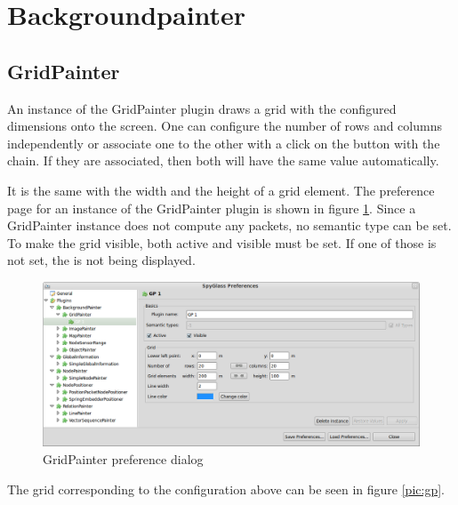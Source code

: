 \newpage
\section{Backgroundpainter}

\subsection{GridPainter}

An instance of the GridPainter plugin draws a grid with the configured dimensions onto the screen.
One can configure the number of rows and columns independently or associate one to the other with a click
on the button with the chain. If they are associated, then both will have the same value automatically.

It is the same with the width and the height of a grid element. The preference page for an instance of the GridPainter
plugin is shown in figure \ref{pic:gp_preferences}. Since a GridPainter instance does not compute any packets, no semantic type
can be set. To make the grid visible, both active and visible must be set. If one of those is not set, the
is not being displayed.

\begin{figure}[htb]
  \begin{center}
    \includegraphics[width=13.2cm]{./pics/gridpainter_prefpage}
    \caption{GridPainter preference dialog}
    \label{pic:gp_preferences}
  \end{center}
\end{figure}

The grid corresponding to the configuration above can be seen in figure \ref{pic:gp}.

